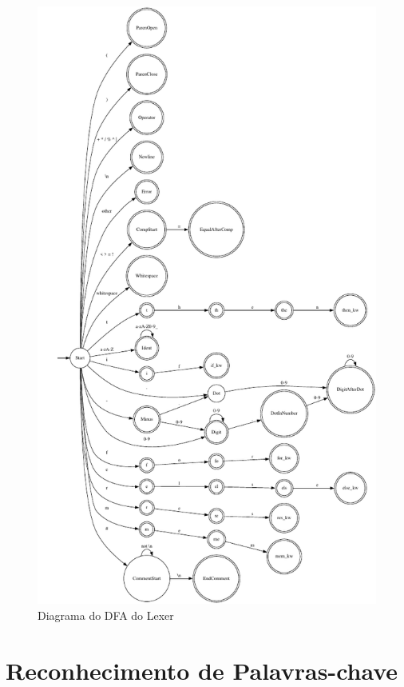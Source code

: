 \documentclass[a4paper,12pt]{article}
\begin{document}
\begin{figure}[H]
    \centering
    \includegraphics[width=\textwidth,height=\textheight,keepaspectratio]{graphviz-3.pdf}
    \caption{Diagrama do DFA do Lexer}
    \label{fig:dfa}
\end{figure}

\section*{Reconhecimento de Palavras-chave}
\end{document}
